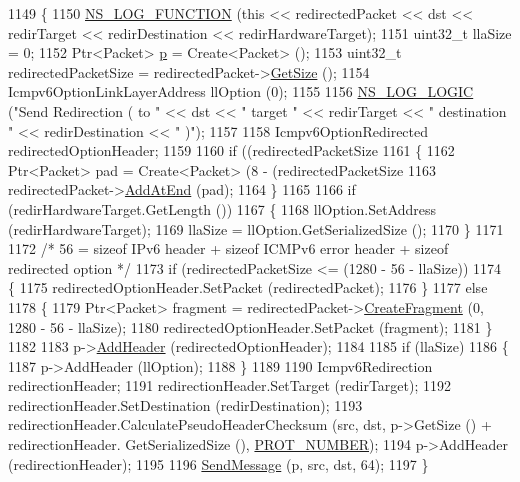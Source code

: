 \begin{DoxyCode}
1149 \{
1150   \hyperlink{log-macros-disabled_8h_a90b90d5bad1f39cb1b64923ea94c0761}{NS\_LOG\_FUNCTION} (\textcolor{keyword}{this} << redirectedPacket << dst << redirTarget << redirDestination << 
      redirHardwareTarget);
1151   uint32\_t llaSize = 0;
1152   Ptr<Packet> \hyperlink{lte__link__budget_8m_ac9de518908a968428863f829398a4e62}{p} = Create<Packet> ();
1153   uint32\_t redirectedPacketSize = redirectedPacket->\hyperlink{classns3_1_1Packet_a462855c9929954d4301a4edfe55f4f1c}{GetSize} ();
1154   Icmpv6OptionLinkLayerAddress llOption (0);
1155 
1156   \hyperlink{group__logging_ga88acd260151caf2db9c0fc84997f45ce}{NS\_LOG\_LOGIC} (\textcolor{stringliteral}{"Send Redirection ( to "} << dst << \textcolor{stringliteral}{" target "} << redirTarget << \textcolor{stringliteral}{" destination "}
       << redirDestination << \textcolor{stringliteral}{" )"});
1157 
1158   Icmpv6OptionRedirected redirectedOptionHeader;
1159 
1160   \textcolor{keywordflow}{if} ((redirectedPacketSize %
1161     \{
1162       Ptr<Packet> pad = Create<Packet> (8 - (redirectedPacketSize %
1163       redirectedPacket->\hyperlink{classns3_1_1Packet_a14ec3d4250b425468764de58f5837b6b}{AddAtEnd} (pad);
1164     \}
1165 
1166   \textcolor{keywordflow}{if} (redirHardwareTarget.GetLength ())
1167     \{
1168       llOption.SetAddress (redirHardwareTarget);
1169       llaSize = llOption.GetSerializedSize ();
1170     \}
1171 
1172   \textcolor{comment}{/* 56 = sizeof IPv6 header + sizeof ICMPv6 error header + sizeof redirected option */}
1173   \textcolor{keywordflow}{if} (redirectedPacketSize <= (1280 - 56 - llaSize))
1174     \{
1175       redirectedOptionHeader.SetPacket (redirectedPacket);
1176     \}
1177   \textcolor{keywordflow}{else}
1178     \{
1179       Ptr<Packet> fragment = redirectedPacket->\hyperlink{classns3_1_1Packet_a16f6113606b355b2b346e2245fa2a3d0}{CreateFragment} (0, 1280 - 56 - llaSize);
1180       redirectedOptionHeader.SetPacket (fragment);
1181     \}
1182 
1183   p->\hyperlink{classns3_1_1Packet_a465108c595a0bc592095cbcab1832ed8}{AddHeader} (redirectedOptionHeader);
1184 
1185   \textcolor{keywordflow}{if} (llaSize)
1186     \{
1187       p->AddHeader (llOption);
1188     \}
1189 
1190   Icmpv6Redirection redirectionHeader;
1191   redirectionHeader.SetTarget (redirTarget);
1192   redirectionHeader.SetDestination (redirDestination);
1193   redirectionHeader.CalculatePseudoHeaderChecksum (src, dst, p->GetSize () + redirectionHeader.
      GetSerializedSize (), \hyperlink{classns3_1_1Icmpv6L4Protocol_aa56c41a886a45b8b4f22a19afc827e2d}{PROT\_NUMBER});
1194   p->AddHeader (redirectionHeader);
1195 
1196   \hyperlink{classns3_1_1Icmpv6L4Protocol_aca22b3999b518531f807d822060a06a8}{SendMessage} (p, src, dst, 64);
1197 \}
\end{DoxyCode}


